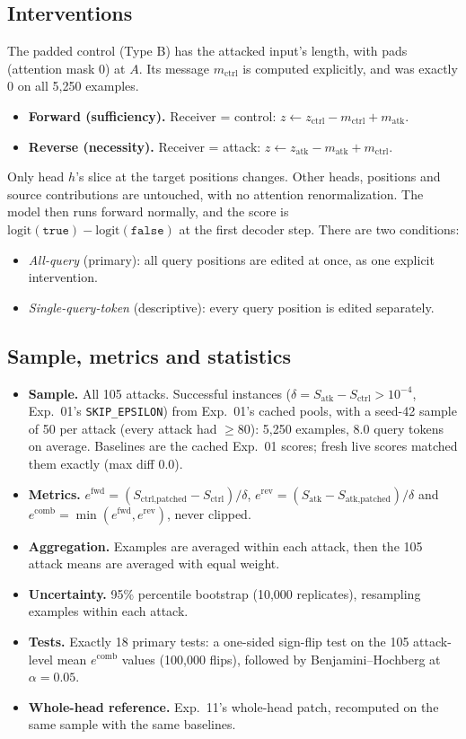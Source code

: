 \documentclass[11pt]{article}
\newcommand{\fwd}{\ensuremath{e^{\mathrm{fwd}}}}
\newcommand{\rev}{\ensuremath{e^{\mathrm{rev}}}}
\newcommand{\comb}{\ensuremath{e^{\mathrm{comb}}}}
\begin{document}
\subsection{Interventions}
The padded control (Type B) has the attacked input's length, with pads
(attention mask 0) at $A$. Its message $m_{\text{ctrl}}$ is computed
explicitly, and was exactly $0$ on all 5{,}250 examples.
\begin{itemize}[nosep]
\item \textbf{Forward (sufficiency).} Receiver = control:
  $z\leftarrow z_{\text{ctrl}}-m_{\text{ctrl}}+m_{\text{atk}}$.
\item \textbf{Reverse (necessity).} Receiver = attack:
  $z\leftarrow z_{\text{atk}}-m_{\text{atk}}+m_{\text{ctrl}}$.
\end{itemize}
Only head $h$'s slice at the target positions changes. Other heads,
positions and source contributions are untouched, with no attention
renormalization. The model then runs forward normally, and the score is
$\mathrm{logit}(\texttt{true})-\mathrm{logit}(\texttt{false})$ at the first
decoder step. There are two conditions:
\begin{itemize}[nosep]
\item \emph{All-query} (primary): all query positions are edited at once, as
  one explicit intervention.
\item \emph{Single-query-token} (descriptive): every query position is edited
  separately.
\end{itemize}

\subsection{Sample, metrics and statistics}
\begin{itemize}[nosep]
\item \textbf{Sample.} All 105 attacks. Successful instances
  ($\delta=S_{\text{atk}}-S_{\text{ctrl}}>10^{-4}$, Exp.~01's
  \texttt{SKIP\_EPSILON}) from Exp.~01's cached pools, with a seed-42 sample
  of 50 per attack (every attack had $\ge 80$): 5{,}250 examples, 8.0 query
  tokens on average. Baselines are the cached Exp.~01 scores; fresh live
  scores matched them exactly (max diff $0.0$).
\item \textbf{Metrics.}
  $\fwd=(S_{\text{ctrl,patched}}-S_{\text{ctrl}})/\delta$,
  $\rev=(S_{\text{atk}}-S_{\text{atk,patched}})/\delta$ and
  $\comb=\min(\fwd,\rev)$, never clipped.
\item \textbf{Aggregation.} Examples are averaged within each attack, then
  the 105 attack means are averaged with equal weight.
\item \textbf{Uncertainty.} 95\% percentile bootstrap (10{,}000 replicates),
  resampling examples within each attack.
\item \textbf{Tests.} Exactly 18 primary tests: a one-sided sign-flip test on
  the 105 attack-level mean \comb{} values (100{,}000 flips), followed by
  Benjamini--Hochberg at $\alpha=0.05$.
\item \textbf{Whole-head reference.} Exp.~11's whole-head patch, recomputed
  on the same sample with the same baselines.
\end{itemize}
\end{document}
